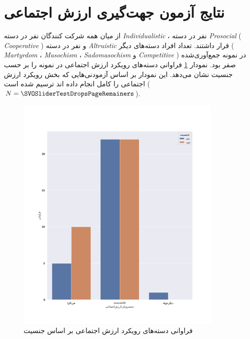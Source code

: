 \section{نتایج آزمون جهت‌گیری ارزش اجتماعی}
از میان همه شرکت کنندگان
\noOfIndividualisticParticipants
نفر در دسته
\textit{
    \gls{Individualistic}
}
،
\noOfCooperativeParticipants
نفر در دسته
\textit{
    \gls{Prosocial}
}\!(\textit{
    \gls{Cooperative}
})
و
\noOfAltruisticParticipants
نفر در دسته
\textit{
    \gls{Altruistic}
}
قرار داشتند.
تعداد افراد دسته‌های دیگر
\!(\!\textit{
    \gls{Martyrdom}
}،
\textit{
    \gls{Masochism}
}،
\textit{
    \gls{Sadomasochism}
} و
\textit{
    \gls{Competitive}
}\!)
در نمونه جمع‌آوری‌شده صفر بود.
نمودار \ref{fig:SVOAgainstPopulationSexBarPlot}
فراوانی دسته‌های رویکرد ارزش اجتماعی در نمونه را بر حسب جنسیت نشان می‌دهد.
این نمودار بر اساس آزمودنی‌هایی که
بخش رویکرد ارزش اجتماعی را کامل انجام داده اند ترسیم شده است
($N=\SVOSliderTestDropsPageRemainers$).

\begin{figure}[htpb]
    \centering
    \includegraphics[width=0.9\textwidth]{./img/SVOAgainstPopulationSexBarPlot.png}
    \caption{فراوانی دسته‌های رویکرد ارزش اجتماعی بر اساس جنسیت}
    \label{fig:SVOAgainstPopulationSexBarPlot}
\end{figure}
